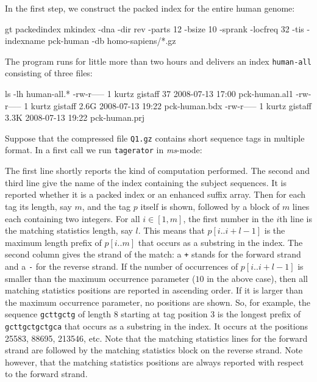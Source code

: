 \documentclass[12pt]{article}
\newcommand{\Substring}[3]{#1[#2..#3]}
\newcommand{\Program}[0]{\texttt{tagerator}\xspace}
\begin{document}
In the first step, we construct the packed index for the entire human genome:

\begin{Output}
gt packedindex mkindex -dna -dir rev -parts 12 -bsize 10 -sprank -locfreq 32
                       -tis -indexname pck-human -db homo-sapiens/*.gz
\end{Output}

The program runs for little more than two hours and delivers 
an index \texttt{human-all} consisting of three files:

\begin{Output}
ls -lh human-all.*
-rw-r----- 1 kurtz gistaff   37 2008-07-13 17:00 pck-human.al1
-rw-r----- 1 kurtz gistaff 2.6G 2008-07-13 19:22 pck-human.bdx
-rw-r----- 1 kurtz gistaff 3.3K 2008-07-13 19:22 pck-human.prj
\end{Output}

Suppose that the compressed file \texttt{Q1.gz} contains short sequence tags
in multiple \Fasta format. In a first call we run \Program in \textit{ms}-mode:


The first line shortly reports the kind of computation performed. The second
and third line give the name of the index containing the subject sequences.
It is reported whether it is a packed index or an enhanced suffix array. 
Then for
each tag its length, say \(m\), and the tag \(p\) itself is shown, followed by 
a block of \(m\) lines each containing two integers. For all \(i\in[1,m]\), 
the first number in the \(i\)th line is the matching statistics length, say
\(l\). This means that \(\Substring{p}{i}{i+l-1}\) is the maximum length prefix
of \(\Substring{p}{i}{m}\) that occurs as a substring in the index.  The
second column gives the strand of the match: a \texttt{+} stands for the
forward strand and a \texttt{-} for the reverse strand.
If the number of occurrences of \(\Substring{p}{i}{i+l-1}\) is smaller than 
the maximum
occurrence parameter (\(10\) in the above case), then all matching statistics 
positions are reported in ascending order. If it is larger than the maximum
occurrence parameter, no positions are shown.
So, for example, the sequence \texttt{gcttgctg} of length 8 starting at tag
position 3 is the longest prefix of \texttt{gcttgctgctgca} that occurs as 
a substring in the index. It occurs at the positions 25583, 88695, 213546,
etc. Note that the matching statistics lines for the forward strand are
followed by the matching statistics block on the reverse strand. Note however,
that the matching statistics positions are always reported with respect to the
forward strand.
\end{document}
